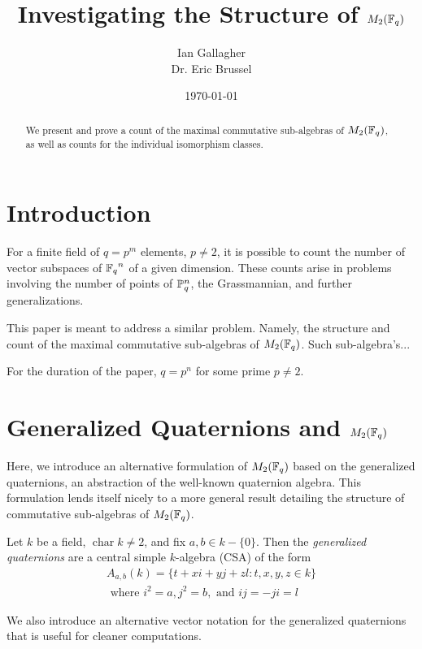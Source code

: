 \documentclass{amsart}
\title{Investigating the Structure of $M_2(\protect\mathbb{F}_q)$}
\author{Ian Gallagher \\ Dr. Eric Brussel}
\date{\today}
\begin{document}
\maketitle

\begin{abstract}
    We present and prove a count of the maximal commutative sub-algebras of
    $M_2(\protect\mathbb{F}_q)$, as well as counts for the individual isomorphism classes. 
\end{abstract}

\section{Introduction}
For a finite field of $q = p^m$ elements, $p \neq 2$, it is possible to count the number of
vector subspaces of ${\protect\mathbb{F}_q}^n$ of a given dimension. These counts arise in
problems involving the number of points of $\protect\mathbb{P}^n_q$, the Grassmannian,
and further generalizations. %

This paper is meant to address a similar problem. Namely, the structure and 
count of the maximal commutative sub-algebras of $M_2(\protect\mathbb{F}_q)$. Such
sub-algebra's...

For the duration of the paper, $q = p^n$ for some prime $p \neq 2$.

\section{Generalized Quaternions and $M_2(\protect\mathbb{F}_q)$}
Here, we introduce an alternative formulation of $M_2(\protect\mathbb{F}_q)$ based on the generalized quaternions, an abstraction of the well-known quaternion algebra. This formulation lends itself nicely to a more general result detailing the structure of commutative sub-algebras of $M_2(\protect\mathbb{F}_q)$.

\begin{defn}
    Let $k$ be a field, $\operatorname{char} k \neq 2$, and fix $a,b \in k-\{0\}$. Then the \textit{generalized quaternions} are a central simple $k$-algebra (CSA) of the form 
\begin{gather*}
    A_{a,b}(k) = \{t + xi + yj + zl : t,x,y,z \in k\} \\
    \text{ where }i^2 =a, j^2 = b, \text{ and } ij = -ji=l
\end{gather*}
\end{defn}

We also introduce an alternative vector notation for the generalized quaternions that is useful for cleaner computations.
\end{document}
